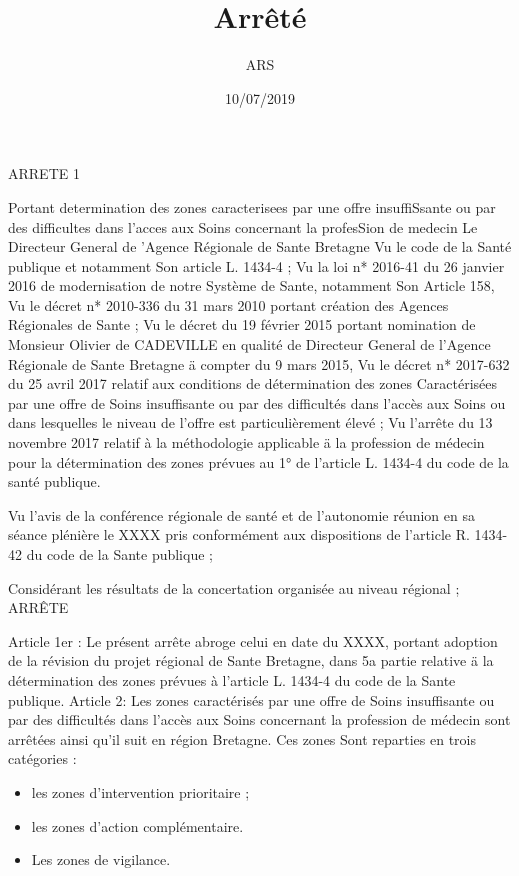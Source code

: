 \documentclass[]{article}
\title{Arrêté}
\author{ARS}
\date{10/07/2019}
\begin{document}
\maketitle

ARRETE 1

Portant determination des zones caracterisees par une offre
insuffiSsante ou par des difficultes dans l'acces aux Soins concernant
la profesSion de medecin Le Directeur General de \textbar{}'Agence
Régionale de Sante Bretagne Vu le code de la Santé publique et notamment
Son article L. 1434-4 ; Vu la loi n* 2016-41 du 26 janvier 2016 de
modernisation de notre Système de Sante, notamment Son Article 158, Vu
le décret n* 2010-336 du 31 mars 2010 portant création des Agences
Régionales de Sante ; Vu le décret du 19 février 2015 portant nomination
de Monsieur Olivier de CADEVILLE en qualité de Directeur General de
l'Agence Régionale de Sante Bretagne ä compter du 9 mars 2015, Vu le
décret n* 2017-632 du 25 avril 2017 relatif aux conditions de
détermination des zones Caractérisées par une offre de Soins
insuffisante ou par des difficultés dans l'accès aux Soins ou dans
lesquelles le niveau de l'offre est particulièrement élevé ; Vu l'arrête
du 13 novembre 2017 relatif à la méthodologie applicable ä la profession
de médecin pour la détermination des zones prévues au 1° de l'article L.
1434-4 du code de la santé publique.

Vu l'avis de la conférence régionale de santé et de l'autonomie réunion
en sa séance plénière le XXXX pris conformément aux dispositions de
l'article R. 1434-42 du code de la Sante publique ;

Considérant les résultats de la concertation organisée au niveau
régional ; ARRÊTE

Article 1er : Le présent arrête abroge celui en date du XXXX, portant
adoption de la révision du projet régional de Sante Bretagne, dans 5a
partie relative ä la détermination des zones prévues à l'article L.
1434-4 du code de la Sante publique. Article 2: Les zones caractérisés
par une offre de Soins insuffisante ou par des difficultés dans l'accès
aux Soins concernant la profession de médecin sont arrêtées ainsi qu'il
suit en région Bretagne. Ces zones Sont reparties en trois catégories :

\begin{itemize}
\item
  les zones d'intervention prioritaire ;
\item
  les zones d'action complémentaire.
\item
  Les zones de vigilance.
\end{itemize}
\end{document}
